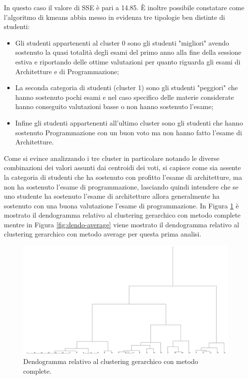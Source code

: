 \documentclass[12pt]{article}
\begin{document}
In questo caso il valore di SSE è pari a 14.85. È inoltre possibile constatare come l'algoritmo di kmeans abbia messo in evidenza tre tipologie ben distinte di studenti:
\begin{itemize}
	\item Gli studenti appartenenti al cluster 0 sono gli studenti "migliori" a\-vendo sostenuto la quasi totalità degli esami del primo anno alla fine della sessione estiva e riportando delle ottime valutazioni per quanto riguarda gli esami di Architetture e di Programmazione;
	\item La seconda categoria di studenti (cluster 1) sono gli studenti "peg\-giori" che hanno sostenuto pochi esami e nel caso specifico delle materie considerate hanno conseguito valutazioni basse o non hanno sostenuto l'esame;
	\item Infine gli studenti appartenenti all'ultimo cluster sono gli studenti che hanno sostenuto Programmazione con un buon voto ma non hanno fatto l'esame di Architetture.
\end{itemize}
Come si evince analizzando i tre cluster in particolare notando le diverse combinazioni dei valori assunti dai centroidi dei voti, si capisce come sia assente la categoria di studenti che ha sostenuto con profitto l'esame di architetture, ma non ha sostenuto l'esame di programmazione,
lasciando quindi intendere che se uno studente ha sostenuto l'esame di architetture allora generalmente ha sostenuto con una buona valutazione l'esame di programmazione.
In Figura \ref{fig:dendo-complete} è mostrato il dendogramma relativo al clustering gerarchico con metodo complete mentre in Figura \ref{fig:dendo-average} viene mostrato il dendogramma relativo al clustering gerarchico con metodo average per questa prima analisi.
\begin{figure}[H]
	\includegraphics[width=\textwidth]{img/hierarchical-complete.png}
	\caption{Dendogramma relativo al clustering gerarchico con metodo complete.}
	\label{fig:dendo-complete}
\end{figure}
\end{document}

